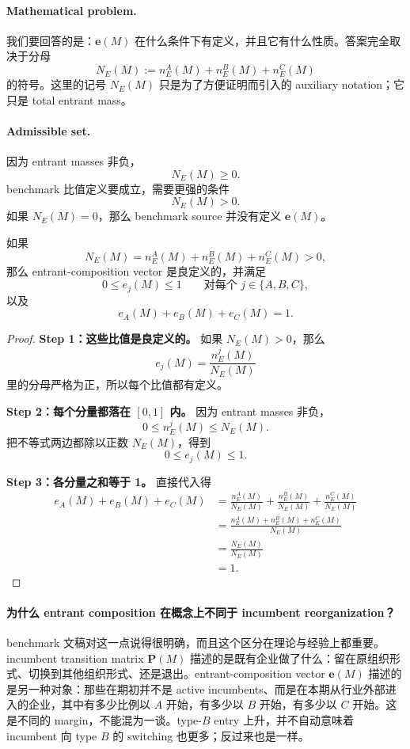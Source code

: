 \paragraph{Mathematical problem.}
我们要回答的是：$\mathbf e(M)$ 在什么条件下有定义，并且它有什么性质。答案完全取决于分母
\[
N_E(M):=n_E^A(M)+n_E^B(M)+n_E^C(M)
\]
的符号。这里的记号 $N_E(M)$ 只是为了方便证明而引入的 auxiliary notation；它只是 total entrant mass。

\paragraph{Admissible set.}
因为 entrant masses 非负，
\[
N_E(M)\ge 0.
\]
benchmark 比值定义要成立，需要更强的条件
\[
N_E(M)>0.
\]
如果 $N_E(M)=0$，那么 benchmark source 并没有定义 $\mathbf e(M)$。

\begin{proposition}
如果
\[
N_E(M)=n_E^A(M)+n_E^B(M)+n_E^C(M)>0,
\]
那么 entrant-composition vector 是良定义的，并满足
\[
0\le e_j(M)\le 1
\qquad\text{对每个 }j\in\{A,B,C\},
\]
以及
\[
e_A(M)+e_B(M)+e_C(M)=1.
\]
\end{proposition}

\begin{proof}
\medskip\noindent\textbf{Step 1：这些比值是良定义的。}
如果 $N_E(M)>0$，那么
\[
e_j(M)=\frac{n_E^j(M)}{N_E(M)}
\]
里的分母严格为正，所以每个比值都有定义。

\medskip\noindent\textbf{Step 2：每个分量都落在 $[0,1]$ 内。}
因为 entrant masses 非负，
\[
0\le n_E^j(M)\le N_E(M).
\]
把不等式两边都除以正数 $N_E(M)$，得到
\[
0\le e_j(M)\le 1.
\]

\medskip\noindent\textbf{Step 3：各分量之和等于 1。}
直接代入得
\begin{align*}
e_A(M)+e_B(M)+e_C(M)
&=
\frac{n_E^A(M)}{N_E(M)}
+
\frac{n_E^B(M)}{N_E(M)}
+
\frac{n_E^C(M)}{N_E(M)}\\
&=
\frac{n_E^A(M)+n_E^B(M)+n_E^C(M)}{N_E(M)}\\
&=
\frac{N_E(M)}{N_E(M)}\\
&=1.
\end{align*}
\end{proof}

\paragraph{为什么 entrant composition 在概念上不同于 incumbent reorganization？}
benchmark 文稿对这一点说得很明确，而且这个区分在理论与经验上都重要。incumbent transition matrix $\mathbf P(M)$ 描述的是既有企业做了什么：留在原组织形式、切换到其他组织形式、还是退出。entrant-composition vector $\mathbf e(M)$ 描述的是另一种对象：那些在期初并不是 active incumbents、而是在本期从行业外部进入的企业，其中有多少比例以 $A$ 开始，有多少以 $B$ 开始，有多少以 $C$ 开始。这是不同的 margin，不能混为一谈。type-$B$ entry 上升，并不自动意味着 incumbent 向 type $B$ 的 switching 也更多；反过来也是一样。

